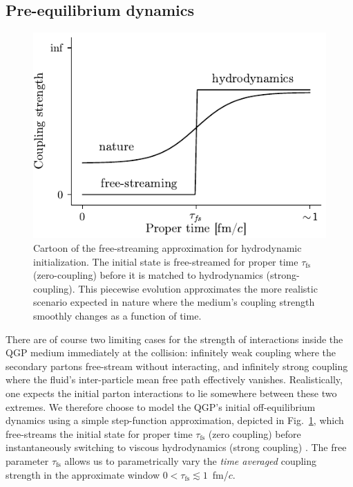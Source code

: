 \documentclass[aps,prc,reprint,amsmath,nofootinbib]{revtex4-1}
\newcommand{\taufs}{\tau_\mathrm{fs}}
\begin{document}
\subsection{Pre-equilibrium dynamics}

\begin{figure}[b]
  \includegraphics{coupling}
  \caption{Cartoon of the free-streaming approximation for hydrodynamic initialization. The initial state is free-streamed for proper time $\taufs$ (zero-coupling) before it is matched to hydrodynamics (strong-coupling). This piecewise evolution approximates the more realistic scenario expected in nature where the medium's coupling strength smoothly changes as a function of time.}
  \label{fig:coupling}
\end{figure}

There are of course two limiting cases for the strength of interactions inside the QGP medium immediately at the collision: infinitely weak coupling where the secondary partons free-stream without interacting, and infinitely strong coupling where the fluid's inter-particle mean free path effectively vanishes.
Realistically, one expects the initial parton interactions to lie somewhere between these two extremes.
We therefore choose to model the QGP's initial off-equilibrium dynamics using a simple step-function approximation, depicted in Fig.~\ref{fig:coupling}, which free-streams the initial state for proper time $\taufs$ (zero coupling) before instantaneously switching to viscous hydrodynamics (strong coupling) \cite{Liu:2015nwa, Broniowski:2008qk}.
The free parameter $\taufs$ allows us to parametrically vary the \emph{time averaged} coupling strength in the approximate window $0 < \taufs \lesssim1$~fm/$c$.
\end{document}
